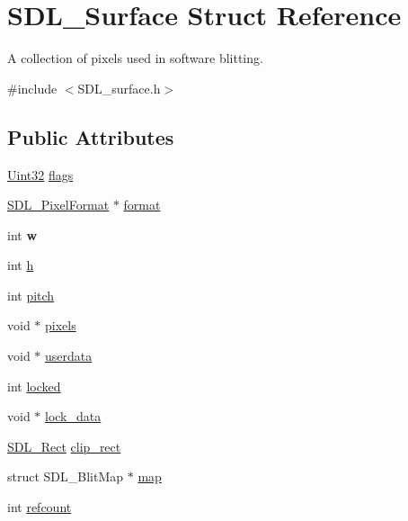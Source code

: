 \hypertarget{struct_s_d_l___surface}{}\section{S\+D\+L\+\_\+\+Surface Struct Reference}
\label{struct_s_d_l___surface}


A collection of pixels used in software blitting.  




{\ttfamily \#include $<$S\+D\+L\+\_\+surface.\+h$>$}

\subsection*{Public Attributes}
\begin{DoxyCompactItemize}
\item 
\hyperlink{_s_d_l__stdinc_8h_add440eff171ea5f55cb00c4a9ab8672d}{Uint32} \hyperlink{struct_s_d_l___surface_a86d78b665d5dfd7aa1dd9696b067641b}{flags}
\item 
\hyperlink{struct_s_d_l___pixel_format}{S\+D\+L\+\_\+\+Pixel\+Format} $\ast$ \hyperlink{struct_s_d_l___surface_a0a90721f947c10c3b79e02ccb419ca62}{format}
\item 
\mbox{\label{struct_s_d_l___surface_a9b0ec7185dcdb2a3530a9160a6ea83d9}} 
int {\bfseries w}
\item 
int \hyperlink{struct_s_d_l___surface_af33bcf87a1f5e10a99b3c7e8626b38c8}{h}
\item 
int \hyperlink{struct_s_d_l___surface_a5fa37325d77d65b2ed64ffc7cd01bb6c}{pitch}
\item 
void $\ast$ \hyperlink{struct_s_d_l___surface_abd9597e0e084b8ef33fe0397bc26d911}{pixels}
\item 
void $\ast$ \hyperlink{struct_s_d_l___surface_ae66d973dcb9b57cb34815892e1ee1f31}{userdata}
\item 
int \hyperlink{struct_s_d_l___surface_a5022edaeea1c0a055fa5d6dccba41de2}{locked}
\item 
void $\ast$ \hyperlink{struct_s_d_l___surface_a0afacfb933b54a9af0846a307a6924fb}{lock\+\_\+data}
\item 
\hyperlink{struct_s_d_l___rect}{S\+D\+L\+\_\+\+Rect} \hyperlink{struct_s_d_l___surface_aa9a0da3b38261dad6cf0cc4e3bb5b0c3}{clip\+\_\+rect}
\item 
struct S\+D\+L\+\_\+\+Blit\+Map $\ast$ \hyperlink{struct_s_d_l___surface_a8c1ecad399b0d4f525b1a53b6ee9393f}{map}
\item 
int \hyperlink{struct_s_d_l___surface_a03d10628a359c0674f5ceffd574f1641}{refcount}
\end{DoxyCompactItemize}


